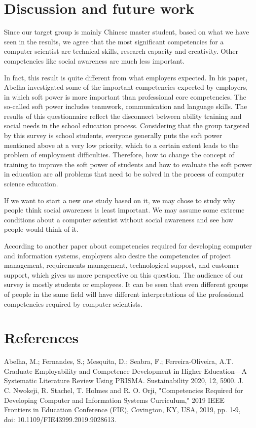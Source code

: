 \documentclass[conference]{IEEEtran}
\begin{document}
\section{Discussion and future work}
\par Since our target group is mainly Chinese master student, based on what we have seen in the results, we agree that the most significant competencies for a computer scientist are technical skills, research capacity and creativity. Other competencies like social awareness are much less important.
\par In fact, this result is quite different from what employers expected. In his paper, Abelha\cite{b1} investigated some of the important competencies expected by employers, in which soft power is more important than professional core competencies. The so-called soft power includes teamwork, communication and language skills. The results of this questionnaire reflect the disconnect between ability training and social needs in the school education process. Considering that the group targeted by this survey is school students, everyone generally puts the soft power mentioned above at a very low priority, which to a certain extent leads to the problem of employment difficulties. Therefore, how to change the concept of training to improve the soft power of students and how to evaluate the soft power in education are all problems that need to be solved in the process of computer science education.
\par If we want to start a new one study based on it, we may chose to study why people think social awareness is least important. We may assume some extreme conditions about a computer scientist without social awareness and see how people would think of it.
\par According to another paper about competencies required for developing computer and information systems, employers also desire the competencies of project management, requirements management, technological support, and customer support\cite{b2}, which gives us more perspective on this question. The audience of our survey is mostly students or employees. It can be seen that even different groups of people in the same field will have different interpretations of the professional competencies required by computer scientists.

\section{References}
\begin{thebibliography}{}
 Abelha, M.; Fernandes, S.; Mesquita, D.; Seabra, F.; Ferreira-Oliveira, A.T. Graduate Employability and Competence Development in Higher Education—A Systematic Literature Review Using PRISMA. Sustainability 2020, 12, 5900.
 J. C. Nwokeji, R. Stachel, T. Holmes and R. O. Orji, "Competencies Required for Developing Computer and Information Systems Curriculum," 2019 IEEE Frontiers in Education Conference (FIE), Covington, KY, USA, 2019, pp. 1-9, doi: 10.1109/FIE43999.2019.9028613.

\end{thebibliography}
\end{document}
